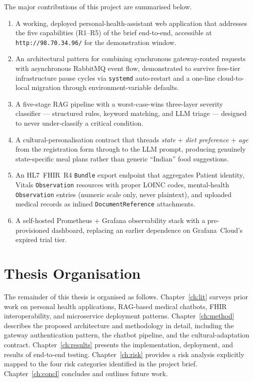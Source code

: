 \documentclass[12pt]{caltech_thesis}
\begin{document}
The major contributions of this project are summarised below.
\begin{enumerate}
    \item A working, deployed personal-health-assistant web application
    that addresses the five capabilities (R1--R5) of the brief end-to-end,
    accessible at \texttt{http://98.70.34.96/} for the demonstration window.
    \item An architectural pattern for combining synchronous gateway-routed
    requests with asynchronous RabbitMQ event flow, demonstrated to
    survive free-tier infrastructure pause cycles via \texttt{systemd}
    auto-restart and a one-line cloud-to-local migration through
    environment-variable defaults.
    \item A five-stage RAG pipeline with a worst-case-wins three-layer
    severity classifier --- structured rules, keyword matching, and LLM
    triage --- designed to never under-classify a critical condition.
    \item A cultural-personalisation contract that threads \textit{state} +
    \textit{diet preference} + \textit{age} from the registration form
    through to the LLM prompt, producing genuinely state-specific meal
    plans rather than generic ``Indian'' food suggestions.
    \item An HL7~FHIR~R4 \texttt{Bundle} export endpoint that aggregates
    Patient identity, Vitals \texttt{Observation} resources with proper
    LOINC codes, mental-health \texttt{Observation} entries (numeric scale
    only, never plaintext), and uploaded medical records as inlined
    \texttt{DocumentReference} attachments.
    \item A self-hosted Prometheus + Grafana observability stack with a
    pre-provisioned dashboard, replacing an earlier dependence on
    Grafana~Cloud's expired trial tier.
\end{enumerate}

\section{Thesis Organisation}

The remainder of this thesis is organised as follows. Chapter~\ref{ch:lit}
surveys prior work on personal health applications, RAG-based medical
chatbots, FHIR interoperability, and microservice deployment patterns.
Chapter~\ref{ch:method} describes the proposed architecture and
methodology in detail, including the gateway authentication pattern, the
chatbot pipeline, and the cultural-adaptation contract.
Chapter~\ref{ch:results} presents the implementation, deployment, and
results of end-to-end testing. Chapter~\ref{ch:risk} provides a risk
analysis explicitly mapped to the four risk categories identified in the
project brief. Chapter~\ref{ch:concl} concludes and outlines future work.
\end{document}

